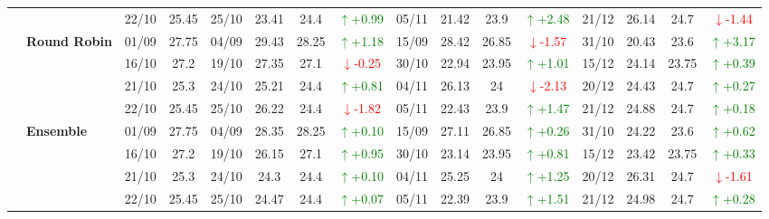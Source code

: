 \documentclass{ieeeaccess}
\begin{document}
{\begin{longtable}{llcc|cccc|cccc|cccc}
&
& 22/10 & 25.45 & 25/10 & 23.41 & 24.4 & \textcolor{green}{\(\uparrow\)+0.99} & 05/11 & 21.42 & 23.9 & \textcolor{green}{\(\uparrow\)+2.48} & 21/12 & 26.14 & 24.7 & \textcolor{red}{\(\downarrow\)-1.44} \\
\cmidrule(lr){2-16}


& \textbf{Round Robin}
& 01/09 & 27.75 & 04/09 & 29.43 & 28.25 & \textcolor{green}{\(\uparrow\)+1.18} & 15/09 & 28.42 & 26.85 & \textcolor{red}{\(\downarrow\)-1.57} & 31/10 & 20.43 & 23.6 & \textcolor{green}{\(\uparrow\)+3.17} \\

&
& 16/10 & 27.2 & 19/10 & 27.35 & 27.1 & \textcolor{red}{\(\downarrow\)-0.25} & 30/10 & 22.94 & 23.95 & \textcolor{green}{\(\uparrow\)+1.01} & 15/12 & 24.14 & 23.75 & \textcolor{green}{\(\uparrow\)+0.39} \\

&
& 21/10 & 25.3 & 24/10 & 25.21 & 24.4 & \textcolor{green}{\(\uparrow\)+0.81} & 04/11 & 26.13 & 24 & \textcolor{red}{\(\downarrow\)-2.13} & 20/12 & 24.43 & 24.7 & \textcolor{green}{\(\uparrow\)+0.27} \\

&
& 22/10 & 25.45 & 25/10 & 26.22 & 24.4 & \textcolor{red}{\(\downarrow\)-1.82} & 05/11 & 22.43 & 23.9 & \textcolor{green}{\(\uparrow\)+1.47} & 21/12 & 24.88 & 24.7 & \textcolor{green}{\(\uparrow\)+0.18} \\
\cmidrule(lr){2-16}



& \textbf{Ensemble}
& 01/09 & 27.75 & 04/09 & 28.35 & 28.25 & \textcolor{green}{\(\uparrow\)+0.10} & 15/09 & 27.11 & 26.85 & \textcolor{green}{\(\uparrow\)+0.26} & 31/10 & 24.22 & 23.6 & \textcolor{green}{\(\uparrow\)+0.62} \\

&
& 16/10 & 27.2 & 19/10 & 26.15 & 27.1 & \textcolor{green}{\(\uparrow\)+0.95} & 30/10 & 23.14 & 23.95 & \textcolor{green}{\(\uparrow\)+0.81} & 15/12 & 23.42 & 23.75 & \textcolor{green}{\(\uparrow\)+0.33} \\

&
& 21/10 & 25.3 & 24/10 & 24.3 & 24.4 & \textcolor{green}{\(\uparrow\)+0.10} & 04/11 & 25.25 & 24 & \textcolor{green}{\(\uparrow\)+1.25} & 20/12 & 26.31 & 24.7 & \textcolor{red}{\(\downarrow\)-1.61} \\

&
& 22/10 & 25.45 & 25/10 & 24.47 & 24.4 & \textcolor{green}{\(\uparrow\)+0.07} & 05/11 & 22.39 & 23.9 & \textcolor{green}{\(\uparrow\)+1.51} & 21/12 & 24.98 & 24.7 & \textcolor{green}{\(\uparrow\)+0.28} \\


\bottomrule
\end{longtable}
}
\end{document}
